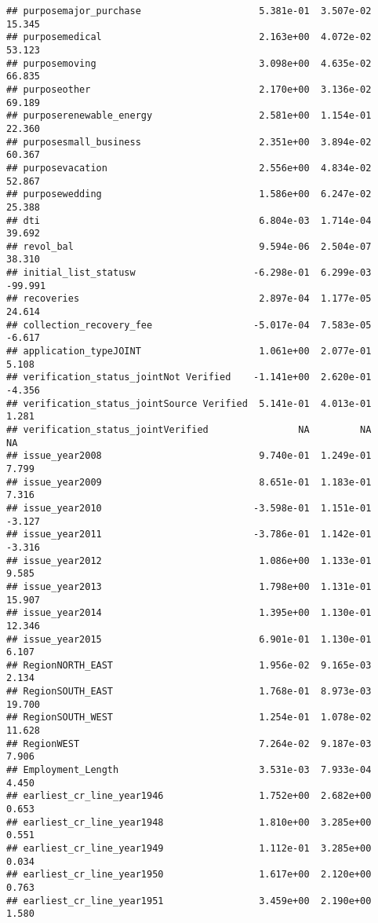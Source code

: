 \documentclass[]{article}
\begin{document}
\begin{verbatim}
## purposemajor_purchase                     5.381e-01  3.507e-02   15.345
## purposemedical                            2.163e+00  4.072e-02   53.123
## purposemoving                             3.098e+00  4.635e-02   66.835
## purposeother                              2.170e+00  3.136e-02   69.189
## purposerenewable_energy                   2.581e+00  1.154e-01   22.360
## purposesmall_business                     2.351e+00  3.894e-02   60.367
## purposevacation                           2.556e+00  4.834e-02   52.867
## purposewedding                            1.586e+00  6.247e-02   25.388
## dti                                       6.804e-03  1.714e-04   39.692
## revol_bal                                 9.594e-06  2.504e-07   38.310
## initial_list_statusw                     -6.298e-01  6.299e-03  -99.991
## recoveries                                2.897e-04  1.177e-05   24.614
## collection_recovery_fee                  -5.017e-04  7.583e-05   -6.617
## application_typeJOINT                     1.061e+00  2.077e-01    5.108
## verification_status_jointNot Verified    -1.141e+00  2.620e-01   -4.356
## verification_status_jointSource Verified  5.141e-01  4.013e-01    1.281
## verification_status_jointVerified                NA         NA       NA
## issue_year2008                            9.740e-01  1.249e-01    7.799
## issue_year2009                            8.651e-01  1.183e-01    7.316
## issue_year2010                           -3.598e-01  1.151e-01   -3.127
## issue_year2011                           -3.786e-01  1.142e-01   -3.316
## issue_year2012                            1.086e+00  1.133e-01    9.585
## issue_year2013                            1.798e+00  1.131e-01   15.907
## issue_year2014                            1.395e+00  1.130e-01   12.346
## issue_year2015                            6.901e-01  1.130e-01    6.107
## RegionNORTH_EAST                          1.956e-02  9.165e-03    2.134
## RegionSOUTH_EAST                          1.768e-01  8.973e-03   19.700
## RegionSOUTH_WEST                          1.254e-01  1.078e-02   11.628
## RegionWEST                                7.264e-02  9.187e-03    7.906
## Employment_Length                         3.531e-03  7.933e-04    4.450
## earliest_cr_line_year1946                 1.752e+00  2.682e+00    0.653
## earliest_cr_line_year1948                 1.810e+00  3.285e+00    0.551
## earliest_cr_line_year1949                 1.112e-01  3.285e+00    0.034
## earliest_cr_line_year1950                 1.617e+00  2.120e+00    0.763
## earliest_cr_line_year1951                 3.459e+00  2.190e+00    1.580

\end{verbatim}
\end{document}
